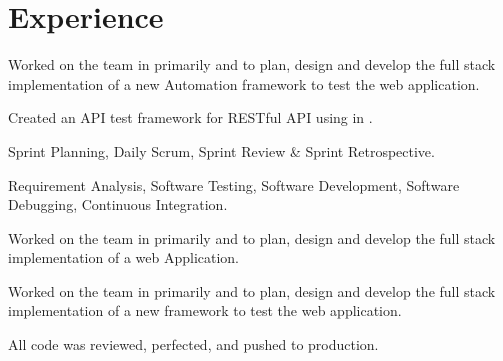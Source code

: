 \documentclass[]{aj-resume-openfont}
\begin{document}
\begin{minipage}[t]{0.66\textwidth} 


\section{Experience}

\vspace{\topsep} %
\begin{tightemize}
\item Worked on the \href{https://www.xpo.com/solutions/transportation/last-mile}{} team in primarily  and  to plan, design and develop the full stack implementation of a new Automation framework to test the web application.
\item Created an API test framework for RESTful API using  in .
\item Sprint Planning, Daily Scrum, Sprint Review \& Sprint Retrospective.
\item Requirement Analysis, Software Testing, Software Development, Software Debugging, Continuous Integration.
\end{tightemize}
\sectionsep

\begin{tightemize}
\item Worked on the  team in primarily  and  to plan, design and develop the full stack implementation of a web Application.
\item Worked on the   team in primarily  and  to plan, design and develop the full stack implementation of a new framework to test the web application.
\item All code was reviewed, perfected, and pushed to production.
\end{tightemize}
\sectionsep


\end{minipage}
\end{document}
